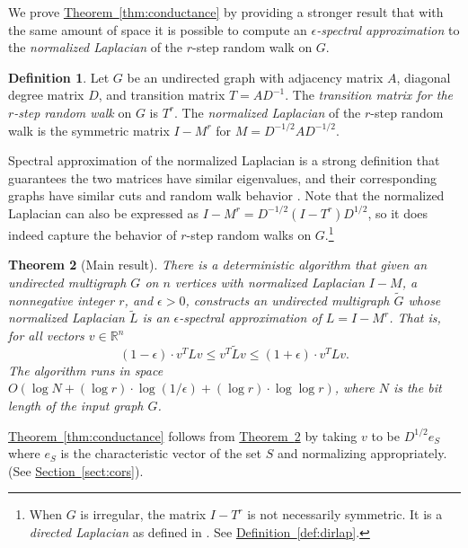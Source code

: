 \documentclass[11pt]{article}
\numberwithin{equation}{section}
\newtheorem{theorem}{Theorem}[section]
\theoremstyle{definition}
\newtheorem{definition}[theorem]{Definition}
\theoremstyle{plain}
\newcommand{\expref}[2]{\hyperref[#2]{#1~\ref{#2}}}
\newcommand{\wt}{\widetilde}   %
\newcommand{\SC}{O(\log N + (\log r)\cdot\log(1/\epsilon)+(\log r)\cdot \log\log r)}
\numberwithin{myalgctr}{section}
\theoremstyle{named}
\begin{document}
We prove \expref{Theorem}{thm:conductance} by providing a stronger result that with the same amount of space it is possible to compute an \emph{$\epsilon$-spectral approximation} to the \emph{normalized Laplacian} of the $r$-step random walk on $G$. 
\begin{definition}
Let $G$ be an undirected graph with adjacency matrix $A$, diagonal degree matrix $D$, and transition matrix $T=AD^{-1}$. The \emph{transition matrix for the $r$-step random walk} on $G$ is $T^r$. The \emph{normalized Laplacian} of the $r$-step random walk is the symmetric matrix $I-M^r$ for $M=D^{-1/2}AD^{-1/2}$. 
\end{definition}
Spectral approximation of the normalized Laplacian is a strong definition that guarantees the two matrices have similar eigenvalues, and their corresponding graphs have similar cuts and random walk behavior \cite{ST11,batson2013spectral}. Note that the normalized Laplacian can also be expressed as
$I-M^r = D^{-1/2}(I-T^r)D^{1/2}$, so it does indeed capture the behavior of $r$-step random walks on $G$.\footnote{When $G$ is irregular, the matrix $I-T^r$ is not necessarily symmetric. It is a \emph{directed Laplacian} as defined in \cite{CKPPSV16, CKPPRSV16}. See \expref{Definition}{def:dirlap}.} 


\begin{theorem}[Main result]
\label{thm:main}
There is a deterministic algorithm that given an undirected multigraph $G$ on $n$ vertices with normalized Laplacian $I-M$, a nonnegative integer $r$, and $\epsilon>0$, constructs an undirected multigraph $\wt{G}$ whose normalized Laplacian $\wt{L}$ is an $\epsilon$-spectral approximation of $L=I-M^r$. That is, for all vectors $v\in\mathbb{R}^n$
\[
(1-\epsilon)\cdot v^{T}Lv \leq v^{T}\wt{L}v \leq (1+\epsilon)\cdot v^{T}Lv.
\]
The algorithm runs in space $\SC$, where $N$ is the bit length of the input graph $G$. 
\end{theorem}

\expref{Theorem}{thm:conductance} follows from \expref{Theorem}{thm:main} by taking $v$ to be $D^{1/2}e_S$ where $e_S$ is the characteristic vector of the set $S$ and normalizing appropriately. (See \expref{Section}{sect:cors}).
%
\end{document}
